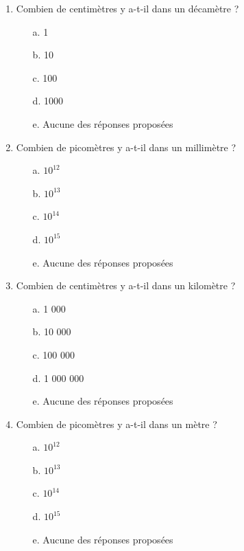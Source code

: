 \documentclass[11pt,a4paper]{article}
\begin{document}
\begin{multicols}{3}
\begin{enumerate}
\columnbreak



\item Combien de centimètres y a-t-il dans un décamètre ?
\begin{enumerate}
\item[a.] 1
\item[b.] 10
\item[c.] 100
\item[d.] 1000
\item[e.] Aucune des réponses proposées
\end{enumerate}




\item Combien de picomètres y a-t-il dans un millimètre ?
\begin{enumerate}
\item[a.] $10^{12}$
\item[b.] $10^{13}$
\item[c.] $10^{14}$
\item[d.] $10^{15}$
\item[e.] Aucune des réponses proposées
\end{enumerate}




\item Combien de centimètres y a-t-il dans un kilomètre ?
\begin{enumerate}
\item[a.] 1 000
\item[b.] 10 000
\item[c.] 100 000
\item[d.] 1 000 000
\item[e.] Aucune des réponses proposées
\end{enumerate}




\item Combien de picomètres y a-t-il dans un mètre ?
\begin{enumerate}
\item[a.] $10^{12}$
\item[b.] $10^{13}$
\item[c.] $10^{14}$
\item[d.] $10^{15}$
\item[e.] Aucune des réponses proposées
\end{enumerate}

\columnbreak



\end{enumerate}
\end{multicols}
\end{document}

